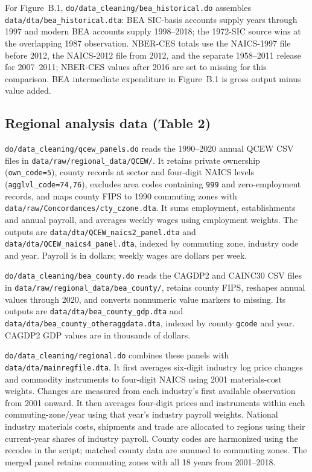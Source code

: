 \documentclass[11pt]{article}
\newcommand{\pkgfile}[1]{\nolinkurl{#1}}
\begin{document}
For Figure~B.1, \pkgfile{do/data_cleaning/bea_historical.do} assembles
\pkgfile{data/dta/bea_historical.dta}: BEA SIC-basis accounts supply years
through 1997 and modern BEA accounts supply 1998--2018; the 1972-SIC source
wins at the overlapping 1987 observation. NBER-CES totals use the
NAICS-1997 file before 2012, the NAICS-2012 file from 2012, and the separate
1958--2011 release for 2007--2011; NBER-CES values after 2016 are set to
missing for this comparison. BEA intermediate expenditure in Figure~B.1 is
gross output minus value added.


\subsection{Regional analysis data (Table 2)}

\pkgfile{do/data_cleaning/qcew_panels.do} reads the 1990--2020 annual
QCEW CSV files in \pkgfile{data/raw/regional_data/QCEW/}. It retains private
ownership (\texttt{own\_code=5}), county records at sector and four-digit
NAICS levels (\texttt{agglvl\_code=74,76}), excludes area codes containing
\texttt{999} and zero-employment records, and maps county FIPS to 1990
commuting zones with \pkgfile{data/raw/Concordances/cty_czone.dta}.
It sums employment, establishments and annual payroll, and averages weekly
wages using employment weights. The outputs are
\pkgfile{data/dta/QCEW_naics2_panel.dta} and
\pkgfile{data/dta/QCEW_naics4_panel.dta}, indexed by commuting zone,
industry code and year. Payroll is in dollars; weekly wages are dollars
per week.

\pkgfile{do/data_cleaning/bea_county.do} reads the CAGDP2 and CAINC30
CSV files in \pkgfile{data/raw/regional_data/bea_county/}, retains county
FIPS, reshapes annual values through 2020, and converts nonnumeric value
markers to missing. Its outputs are \pkgfile{data/dta/bea_county_gdp.dta}
and \pkgfile{data/dta/bea_county_otheraggdata.dta}, indexed by county
\texttt{gcode} and year. CAGDP2 GDP values are in thousands of dollars.

\pkgfile{do/data_cleaning/regional.do} combines these panels with
\pkgfile{data/dta/mainregfile.dta}. It first averages six-digit industry
log price changes and commodity instruments to four-digit NAICS using
2001 materials-cost weights. Changes are measured from each industry's
first available observation from 2001 onward. It then averages four-digit
prices and instruments within each commuting-zone/year using that year's
industry payroll weights. National industry materials costs, shipments
and trade are allocated to regions using their current-year shares of
industry payroll. County codes are harmonized using the recodes in the
script; matched county data are summed to commuting zones. The merged
panel retains commuting zones with all 18 years from 2001--2018.
\end{document}
